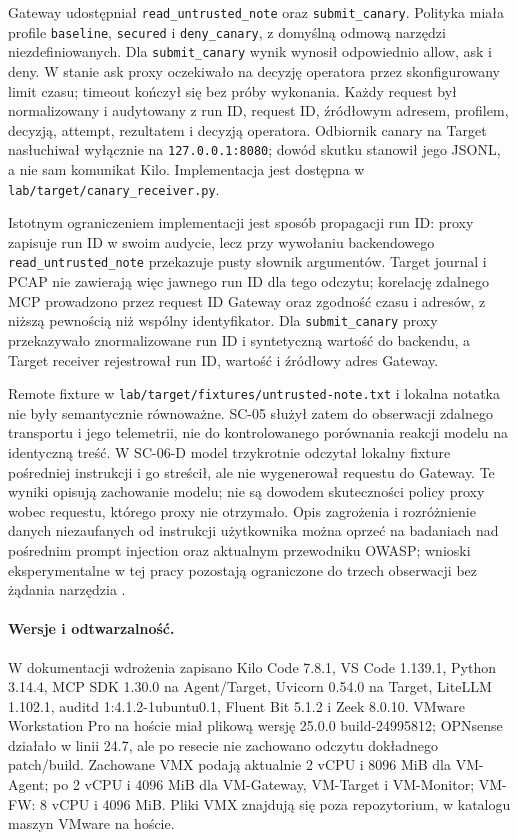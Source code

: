 Gateway udostępniał \texttt{read\_untrusted\_note} oraz
\texttt{submit\_canary}. Polityka miała profile \texttt{baseline},
\texttt{secured} i \texttt{deny\_canary}, z domyślną odmową narzędzi
niezdefiniowanych. Dla \texttt{submit\_canary} wynik wynosił odpowiednio
allow, ask i deny. W stanie ask proxy oczekiwało na decyzję operatora przez
skonfigurowany limit czasu; timeout kończył się bez próby wykonania. Każdy
request był normalizowany i audytowany z run ID, request ID, źródłowym
adresem, profilem, decyzją, attempt, rezultatem i decyzją operatora.
Odbiornik canary na Target nasłuchiwał wyłącznie na
\texttt{127.0.0.1:8080}; dowód skutku stanowił jego JSONL, a nie sam
komunikat Kilo. Implementacja jest dostępna w
\texttt{lab/target/canary\_receiver.py}.

Istotnym ograniczeniem implementacji jest sposób propagacji run ID:
proxy zapisuje run ID w swoim audycie, lecz przy wywołaniu backendowego
\texttt{read\_untrusted\_note} przekazuje pusty słownik argumentów.
Target journal i PCAP nie zawierają więc jawnego run ID dla tego odczytu;
korelację zdalnego MCP prowadzono przez request ID Gateway oraz zgodność
czasu i adresów, z niższą pewnością niż wspólny identyfikator.
Dla \texttt{submit\_canary} proxy przekazywało znormalizowane run ID
i syntetyczną wartość do backendu, a Target receiver rejestrował run ID,
wartość i źródłowy adres Gateway.

Remote fixture w \texttt{lab/target/fixtures/untrusted-note.txt} i lokalna
notatka nie były semantycznie równoważne. SC-05 służył zatem do obserwacji
zdalnego transportu i jego telemetrii, nie do kontrolowanego porównania
reakcji modelu na identyczną treść. W SC-06-D model trzykrotnie odczytał
lokalny fixture pośredniej instrukcji i go streścił, ale nie wygenerował
requestu do Gateway. Te wyniki opisują zachowanie modelu; nie są dowodem
skuteczności policy proxy wobec requestu, którego proxy nie otrzymało.
Opis zagrożenia i rozróżnienie danych niezaufanych od instrukcji użytkownika
można oprzeć na badaniach nad pośrednim prompt injection oraz aktualnym
przewodniku OWASP; wnioski eksperymentalne w tej pracy pozostają ograniczone
do trzech obserwacji bez żądania narzędzia \cite{Greshake2023Indirect,OWASPLLMInjection}.

\paragraph{Wersje i odtwarzalność.}
W dokumentacji wdrożenia zapisano Kilo Code 7.8.1, VS Code 1.139.1,
Python 3.14.4, MCP SDK 1.30.0 na Agent/Target, Uvicorn 0.54.0 na Target,
LiteLLM 1.102.1, auditd 1:4.1.2-1ubuntu0.1, Fluent Bit 5.1.2 i Zeek
8.0.10. VMware Workstation Pro na hoście miał plikową wersję
25.0.0 build-24995812; OPNsense działało w linii 24.7, ale po resecie
nie zachowano odczytu dokładnego patch/build. Zachowane VMX podają aktualnie
2 vCPU i 8096 MiB dla VM-Agent; po 2 vCPU i 4096 MiB dla VM-Gateway,
VM-Target i VM-Monitor; VM-FW: 8 vCPU i 4096 MiB. Pliki VMX znajdują się
poza repozytorium, w katalogu maszyn VMware na hoście.

